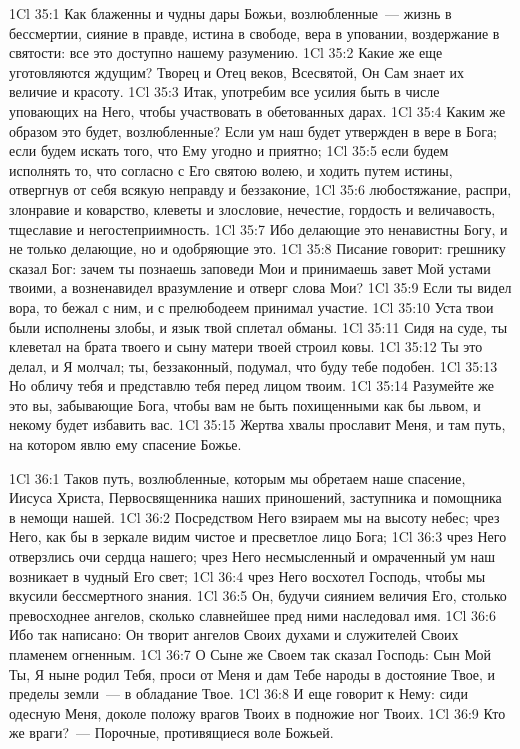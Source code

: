 \vs 1Cl 35:1
Как блаженны и чудны дары
Божьи, возлюбленные~--- жизнь в бессмертии, сияние в правде, истина в свободе,
вера в уповании, воздержание в святости: все это доступно нашему разумению.
\vs 1Cl 35:2
Какие же еще уготовляются
ждущим? Творец и Отец веков, Всесвятой, Он Сам знает их величие и красоту.
\vs 1Cl 35:3
Итак, употребим все усилия
быть в числе уповающих на Него, чтобы участвовать в обетованных дарах.
\vs 1Cl 35:4
Каким же образом это
будет, возлюбленные? Если ум наш будет утвержден в вере в Бога; если будем
искать того, что Ему угодно и приятно;
\vs 1Cl 35:5
если будем исполнять то,
что согласно с Его святою волею, и ходить путем истины, отвергнув от себя
всякую неправду и беззаконие,
\vs 1Cl 35:6
любостяжание, распри,
злонравие и коварство, клеветы и злословие, нечестие, гордость и величавость,
тщеславие и негостеприимность.
\vs 1Cl 35:7
Ибо делающие это
ненавистны Богу, и не только делающие, но и одобряющие это.
\vs 1Cl 35:8
Писание говорит: грешнику
сказал Бог: зачем ты познаешь заповеди Мои и принимаешь завет Мой устами
твоими, а возненавидел вразумление и отверг слова Мои?
\vs 1Cl 35:9
Если ты видел вора, то
бежал с ним, и с прелюбодеем принимал участие.
\vs 1Cl 35:10
Уста твои были исполнены
злобы, и язык твой сплетал обманы.
\vs 1Cl 35:11
Сидя на суде, ты клеветал
на брата твоего и сыну матери твоей строил ковы.
\vs 1Cl 35:12
Ты это делал, и Я молчал;
ты, беззаконный, подумал, что буду тебе подобен.
\vs 1Cl 35:13
Но обличу тебя и
представлю тебя перед лицом твоим.
\vs 1Cl 35:14
Разумейте же это вы,
забывающие Бога, чтобы вам не быть похищенными как бы львом, и некому будет
избавить вас.
\vs 1Cl 35:15
Жертва хвалы прославит
Меня, и там путь, на котором явлю ему спасение Божье.

\vs 1Cl 36:1
Таков путь, возлюбленные,
которым мы обретаем наше спасение, Иисуса Христа, Первосвященника наших
приношений, заступника и помощника в немощи нашей.
\vs 1Cl 36:2
Посредством Него взираем
мы на высоту небес; чрез Него, как бы в зеркале видим чистое и пресветлое лицо
Бога;
\vs 1Cl 36:3
чрез Него отверзлись очи
сердца нашего; чрез Него несмысленный и омраченный ум наш возникает в чудный
Его свет;
\vs 1Cl 36:4
чрез Него восхотел
Господь, чтобы мы вкусили бессмертного знания.
\vs 1Cl 36:5
Он, будучи сиянием величия
Его, столько превосходнее ангелов, сколько славнейшее пред ними наследовал
имя.
\vs 1Cl 36:6
Ибо так написано: Он
творит ангелов Своих духами и служителей Своих пламенем огненным.
\vs 1Cl 36:7
О Сыне же Своем так сказал
Господь: Сын Мой Ты, Я ныне родил Тебя, проси от Меня и дам Тебе народы в
достояние Твое, и пределы земли~--- в обладание Твое.
\vs 1Cl 36:8
И еще говорит к Нему:
сиди одесную Меня, доколе положу врагов Твоих в подножие ног Твоих.
\vs 1Cl 36:9
Кто же враги?~--- Порочные,
противящиеся воле Божьей.

